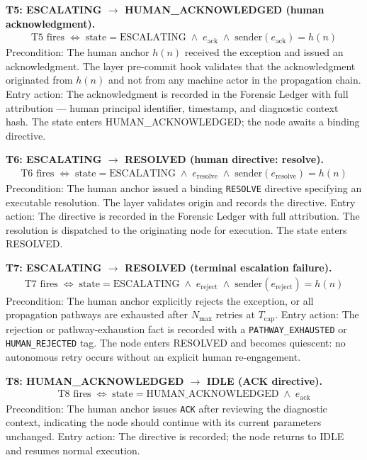 \bigskip
\noindent\textbf{T5: ESCALATING $\rightarrow$ HUMAN\_ACKNOWLEDGED (human acknowledgment).}
\begin{align}
\text{T5 fires} \;\iff\; \text{state} = \text{ESCALATING} \;\land\; e_{\text{ack}} \;\land\; \text{sender}(e_{\text{ack}}) = h(n) \tag{T5}
\end{align}
Precondition: The human anchor $h(n)$ received the exception and issued an acknowledgment. The \fact{} layer pre-commit hook validates that the acknowledgment originated from $h(n)$ and not from any machine actor in the propagation chain. Entry action: The acknowledgment is recorded in the Forensic Ledger with full attribution — human principal identifier, timestamp, and diagnostic context hash. The state enters HUMAN\_ACKNOWLEDGED; the node awaits a binding directive.

\bigskip
\noindent\textbf{T6: ESCALATING $\rightarrow$ RESOLVED (human directive: resolve).}
\begin{align}
\text{T6 fires} \;\iff\; \text{state} = \text{ESCALATING} \;\land\; e_{\text{resolve}} \;\land\; \text{sender}(e_{\text{resolve}}) = h(n) \tag{T6}
\end{align}
Precondition: The human anchor issued a binding \texttt{RESOLVE} directive specifying an executable resolution. The \fact{} layer validates origin and records the directive. Entry action: The directive is recorded in the Forensic Ledger with full attribution. The resolution is dispatched to the originating node for execution. The state enters RESOLVED.

\bigskip
\noindent\textbf{T7: ESCALATING $\rightarrow$ RESOLVED (terminal escalation failure).}
\begin{align}
\text{T7 fires} \;\iff\; \text{state} = \text{ESCALATING} \;\land\; e_{\text{reject}} \;\land\; \text{sender}(e_{\text{reject}}) = h(n) \tag{T7}
\end{align}
Precondition: The human anchor explicitly rejects the exception, or all propagation pathways are exhausted after $N_{\max}$ retries at $T_{\text{cap}}$. Entry action: The rejection or pathway-exhaustion fact is recorded with a \texttt{PATHWAY\_EXHAUSTED} or \texttt{HUMAN\_REJECTED} tag. The node enters RESOLVED and becomes quiescent: no autonomous retry occurs without an explicit human re-engagement.

\bigskip
\noindent\textbf{T8: HUMAN\_ACKNOWLEDGED $\rightarrow$ IDLE (ACK directive).}
\begin{align}
\text{T8 fires} \;\iff\; \text{state} = \text{HUMAN\_ACKNOWLEDGED} \;\land\; e_{\text{ack}} \tag{T8}
\end{align}
Precondition: The human anchor issues \texttt{ACK} after reviewing the diagnostic context, indicating the node should continue with its current parameters unchanged. Entry action: The directive is recorded; the node returns to IDLE and resumes normal execution.

